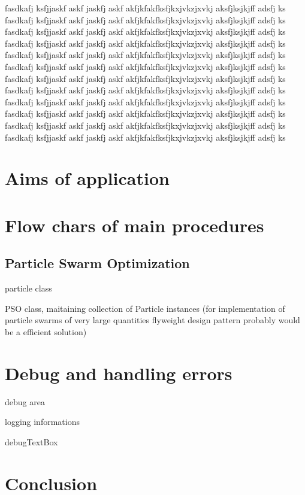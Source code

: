 \documentclass[a4paper,11pt,twocolumn]{article}
\begin{document}
fasdkafj ksfjjaskf askf jaskfj askf akfjkfakfksfjkxjvkzjxvkj aksfjksjkjff adsfj ks
fasdkafj ksfjjaskf askf jaskfj askf akfjkfakfksfjkxjvkzjxvkj aksfjksjkjff adsfj ks
fasdkafj ksfjjaskf askf jaskfj askf akfjkfakfksfjkxjvkzjxvkj aksfjksjkjff adsfj ks
fasdkafj ksfjjaskf askf jaskfj askf akfjkfakfksfjkxjvkzjxvkj aksfjksjkjff adsfj ks
fasdkafj ksfjjaskf askf jaskfj askf akfjkfakfksfjkxjvkzjxvkj aksfjksjkjff adsfj ks
fasdkafj ksfjjaskf askf jaskfj askf akfjkfakfksfjkxjvkzjxvkj aksfjksjkjff adsfj ks
fasdkafj ksfjjaskf askf jaskfj askf akfjkfakfksfjkxjvkzjxvkj aksfjksjkjff adsfj ks
fasdkafj ksfjjaskf askf jaskfj askf akfjkfakfksfjkxjvkzjxvkj aksfjksjkjff adsfj ks
fasdkafj ksfjjaskf askf jaskfj askf akfjkfakfksfjkxjvkzjxvkj aksfjksjkjff adsfj ks
fasdkafj ksfjjaskf askf jaskfj askf akfjkfakfksfjkxjvkzjxvkj aksfjksjkjff adsfj ks
fasdkafj ksfjjaskf askf jaskfj askf akfjkfakfksfjkxjvkzjxvkj aksfjksjkjff adsfj ks
fasdkafj ksfjjaskf askf jaskfj askf akfjkfakfksfjkxjvkzjxvkj aksfjksjkjff adsfj ks

\section{Aims of application}


\section{Flow chars of main procedures}

\subsection{Particle Swarm Optimization}


particle class

PSO class, maitaining collection of Particle instances
(for implementation of particle swarms of very large quantities
flyweight design pattern probably would be a efficient solution)

\section{Debug and handling errors}

debug area

logging informations

debugTextBox


\section{Conclusion}
\end{document}
